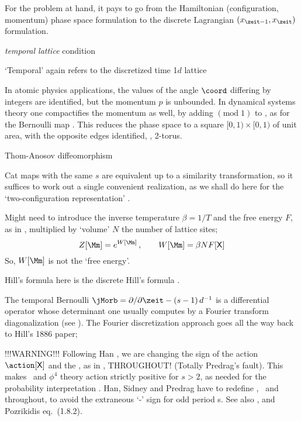 \begin{description}
{For the problem at
hand, it pays to go from the Hamiltonian (configuration, momentum) phase
space formulation to the discrete Lagrangian
$(\ssp_{\zeit-1},\ssp_{\zeit})$ formulation.

\emph{temporal lattice} condition

`Temporal' again refers to the discretized time 1$d$ lattice

In atomic physics applications, the values of the angle $\coord$
differing by integers are identified, but the momentum $p$ is unbounded.
In dynamical systems theory one compactifies the momentum as well, by
adding $(\mbox{mod}\;1)$ to , as for the Bernoulli map
. This reduces the phase space to a square
$[0,1)\times [0,1)$ of unit area, with the opposite edges identified,
\ie, 2-torus.

Thom-Anosov diffeomorphism

Cat maps with the same $s$ are equivalent
up to a similarity transformation, so it suffices to work out a single
convenient realization, as we shall do here for the
\PV{} `two-configuration representation'
.

    }

     {
    Might need to introduce the inverse temperature $\beta = 1/T$ and the
    free energy $F$, as in , multiplied by `volume' $N$
    the number of lattice sites;
\[
  Z[\source]	= e^{W[\source]}
  \,,\qquad
  W[\source] = \beta N F[\Xx]
\]
    So, $W[\source]$ is not the `free energy'.

Hill's formula here is the discrete Hill's formula
.

The temporal Bernoulli {\jacobianOrb} %
$\jMorb=\partial/\partial\zeit-(s-1)\,\shift^{-1}$ is a differential
operator whose determinant one usually computes by a Fourier transform
diagonalization (see ). The Fourier discretization
approach goes all the way back to Hill's 1886 paper;
    }

 {
                    {\color{red}
!!!WARNING!!!
Following Han , we are changing the sign of the
action $\action[\Xx]$ and the {\jacobianOrb}, as in ,
THROUGHOUT! (Totally Predrag's fault).
This makes \catlatt\ and {$\phi^4$} theory action strictly positive
for
${s}>2$, as
needed for the probability interpretation .
                    }
Han, Sidney and Predrag have to redefine
\templatt, \catlatt\ and \henlatt\ {\jacobianOrbs} throughout, to avoid the
extraneous `-' sign for odd period {\lattstate}s.
%
See also , and Pozrikidis
 eq.~(1.8.2).
    }


\end{description}
